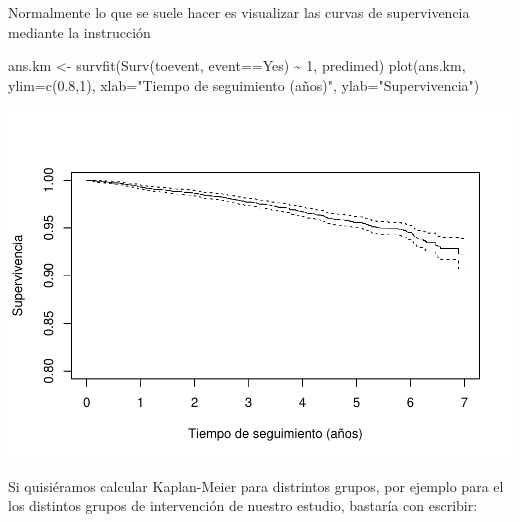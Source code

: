 \documentclass[
]{book}
\newenvironment{Shaded}{\begin{snugshade}}{\end{snugshade}}
\newcommand{\AttributeTok}[1]{\textcolor[rgb]{0.77,0.63,0.00}{#1}}
\newcommand{\DecValTok}[1]{\textcolor[rgb]{0.00,0.00,0.81}{#1}}
\newcommand{\FloatTok}[1]{\textcolor[rgb]{0.00,0.00,0.81}{#1}}
\newcommand{\FunctionTok}[1]{\textcolor[rgb]{0.00,0.00,0.00}{#1}}
\newcommand{\NormalTok}[1]{#1}
\newcommand{\OtherTok}[1]{\textcolor[rgb]{0.56,0.35,0.01}{#1}}
\newcommand{\SpecialCharTok}[1]{\textcolor[rgb]{0.00,0.00,0.00}{#1}}
\newcommand{\StringTok}[1]{\textcolor[rgb]{0.31,0.60,0.02}{#1}}
\begin{document}
Normalmente lo que se suele hacer es visualizar las curvas de supervivencia mediante la instrucción

\begin{Shaded}
\begin{Highlighting}[]
\NormalTok{ans.km }\OtherTok{\textless{}{-}} \FunctionTok{survfit}\NormalTok{(}\FunctionTok{Surv}\NormalTok{(toevent, event}\SpecialCharTok{==}\StringTok{\textquotesingle{}Yes\textquotesingle{}}\NormalTok{) }\SpecialCharTok{\textasciitilde{}} \DecValTok{1}\NormalTok{, predimed)}
\FunctionTok{plot}\NormalTok{(ans.km, }\AttributeTok{ylim=}\FunctionTok{c}\NormalTok{(}\FloatTok{0.8}\NormalTok{,}\DecValTok{1}\NormalTok{), }
     \AttributeTok{xlab=}\StringTok{"Tiempo de seguimiento (años)"}\NormalTok{, }
     \AttributeTok{ylab=}\StringTok{"Supervivencia"}\NormalTok{)}
\end{Highlighting}
\end{Shaded}

\includegraphics{fig_out/unnamed-chunk-153-1.pdf}

Si quisiéramos calcular Kaplan-Meier para distrintos grupos, por ejemplo para el los distintos grupos de intervención de nuestro estudio, bastaría con escribir:

\begin{Shaded}
\end{Shaded}
\end{document}
